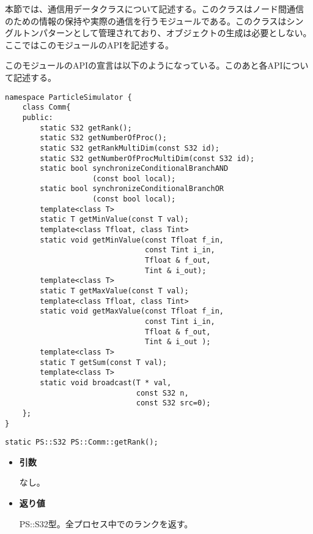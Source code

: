 本節では、通信用データクラスについて記述する。このクラスはノード間通信
のための情報の保持や実際の通信を行うモジュールである。このクラスはシン
グルトンパターンとして管理されており、オブジェクトの生成は必要としない。
ここではこのモジュールのAPIを記述する。


このモジュールのAPIの宣言は以下のようになっている。このあと各APIについ
て記述する。
\begin{lstlisting}[caption=Communication]
namespace ParticleSimulator {
    class Comm{
    public:
        static S32 getRank();
        static S32 getNumberOfProc();
        static S32 getRankMultiDim(const S32 id);
        static S32 getNumberOfProcMultiDim(const S32 id);
        static bool synchronizeConditionalBranchAND
                    (const bool local);
        static bool synchronizeConditionalBranchOR
                    (const bool local);
        template<class T>
        static T getMinValue(const T val);
        template<class Tfloat, class Tint>
        static void getMinValue(const Tfloat f_in,
                                const Tint i_in,
                                Tfloat & f_out,
                                Tint & i_out);
        template<class T>
        static T getMaxValue(const T val);
        template<class Tfloat, class Tint>
        static void getMaxValue(const Tfloat f_in,
                                const Tint i_in,
                                Tfloat & f_out,
                                Tint & i_out );
        template<class T>
        static T getSum(const T val);
        template<class T>
        static void broadcast(T * val,
                              const S32 n,
                              const S32 src=0);
    };
}
\end{lstlisting}


\begin{screen}
\begin{verbatim}
static PS::S32 PS::Comm::getRank();
\end{verbatim}
\end{screen}

\begin{itemize}

\item{{\bf 引数}}

なし。

\item{{\bf 返り値}}

{PS::S32}型。全プロセス中でのランクを返す。

\end{itemize}

